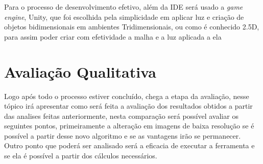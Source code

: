 Para o processo de desenvolvimento efetivo, além da IDE será usado a \textit{game engine}, Unity, que foi escolhida pela simplicidade em aplicar luz e criação de objetos bidimensionais em ambientes Tridimensionais, ou como é conhecido 2.5D, para assim poder criar com efetividade a malha e a luz aplicada a ela

\section{Avaliação Qualitativa}

Logo após todo o processo estiver concluído, chega a etapa da avaliação, nesse tópico irá apresentar como será feita a avaliação dos resultados obtidos a partir das analises feitas anteriormente, nesta comparação será possível avaliar os seguintes pontos, primeiramente a alteração em imagens de baixa resolução se é possível a partir desse novo algoritmo e se as vantagens irão se permanecer. Outro ponto que poderá ser analisado será a eficacia de executar a ferramenta e se ela é possível a partir dos cálculos necessários.